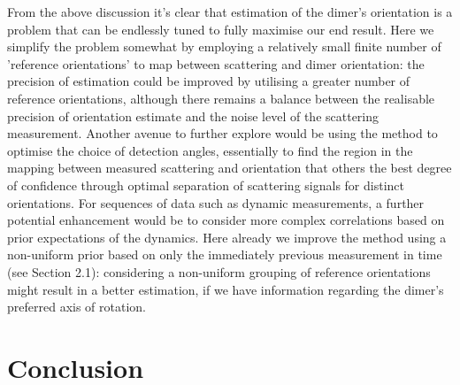 \documentclass[12pt]{spieman}
\begin{document}
\begin{spacing}{1.5}
From the above discussion it’s clear that estimation of the dimer’s orientation is a problem that can be endlessly tuned to fully maximise our end result. Here we simplify the problem somewhat by employing a relatively small finite number of 'reference orientations' to map between scattering and dimer orientation: the precision of estimation could be improved by utilising a greater number of reference orientations, although there remains a balance between the realisable precision of orientation estimate and the noise level of the scattering measurement. Another avenue to further explore would be using the method to optimise the choice of detection angles, essentially to find the region in the mapping between measured scattering and orientation that others the best degree of confidence through optimal separation of scattering signals for distinct orientations. For sequences of data such as dynamic measurements, a further potential enhancement would be to consider more complex correlations based on prior expectations of the dynamics. Here already we improve the method using a non-uniform prior based on only the immediately previous measurement in time (see Section 2.1): considering a non-uniform grouping of reference orientations might result in a better estimation, if we have information regarding the dimer’s preferred axis of rotation. 

\section{Conclusion}
\label{sec:Conclusion}


\end{spacing}
\end{document}
